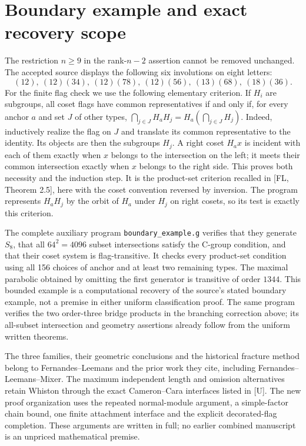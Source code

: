 \section{Boundary example and exact recovery scope}
The restriction $n\geq9$ in the rank-$n-2$ assertion cannot be
removed unchanged. The accepted source displays the following six
involutions on eight letters:
\[
 (12),\ (12)(34),\ (12)(78),\ (12)(56),\ (13)(68),\ (18)(36).
\]
For the finite flag check we use the following elementary criterion.
If $H_i$ are subgroups, all coset flags have common representatives
if and only if, for every anchor $a$ and set $J$ of other types,
$\bigcap_{j\in J}H_aH_j=H_a(\bigcap_{j\in J}H_j)$.
Indeed, inductively realize the flag on $J$ and translate its common
representative to the identity. Its objects are then the subgroups
$H_j$. A right coset $H_ax$ is incident with each of them exactly when
$x$ belongs to the intersection on the left; it meets their common
intersection exactly when $x$ belongs to the right side. This proves
both necessity and the induction step. It is the product-set criterion
recalled in [FL, Theorem 2.5], here with the coset convention reversed
by inversion. The program represents $H_aH_j$ by the orbit of $H_a$
under $H_j$ on right cosets, so its test is exactly this criterion.

The complete auxiliary program \texttt{boundary\_example.g} verifies
that they generate $S_8$, that all $64^2=4096$ subset intersections
satisfy the C-group condition, and that their coset system is
flag-transitive. It checks every product-set condition using all
156 choices of anchor and at least two remaining types. The maximal
parabolic obtained by omitting the first generator is transitive of
order $1344$. This bounded example is a computational recovery of the
source's stated boundary example, not a premise in either uniform
classification proof. The same program verifies the two order-three
bridge products in the branching correction above; its all-subset
intersection and geometry assertions already follow from the uniform
written theorems.

The three families, their geometric conclusions and the historical
fracture method belong to Fernandes--Leemans and the prior work they
cite, including Fernandes--Leemans--Mixer. The maximum independent
length and omission alternatives retain Whiston through the exact
Cameron--Cara interfaces listed in [U]. The new proof organization
uses the repeated normal-module argument, a simple-factor chain bound,
one finite attachment interface and the explicit decorated-flag
completion. These arguments are written in full; no earlier combined
manuscript is an unpriced mathematical premise.

